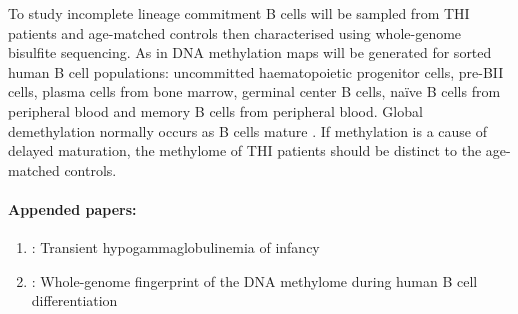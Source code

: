 \documentclass[12pt]{article}
\newcommand{\naive}{na\"{i}ve }
\begin{document}
		To study incomplete lineage commitment B cells will be sampled from THI patients and age-matched controls then characterised using whole-genome bisulfite sequencing.
		As in \citet{Kulis15} DNA methylation maps will be generated for sorted human B cell populations: uncommitted haematopoietic progenitor cells, pre-BII cells, plasma cells from bone marrow, germinal center B cells, \naive B cells from peripheral blood and memory B cells from peripheral blood.
		Global demethylation normally occurs as B cells mature \citep{Oakes16}. 
		If methylation is a cause of delayed maturation, the methylome of THI patients should be distinct to the age-matched controls.
		
		\paragraph{Appended papers:}
		\begin{enumerate}
			\item \citeauthor{Ovadia14} \citeyear{Ovadia14}: Transient hypogammaglobulinemia of infancy \citep{Ovadia14}
			\item \citeauthor{Kulis15} \citeyear{Kulis15}: Whole-genome fingerprint of the DNA methylome during human B cell differentiation \citep{Kulis15}
		\end{enumerate}
		
	
	
	
	
	
	
	
	
\end{document}
